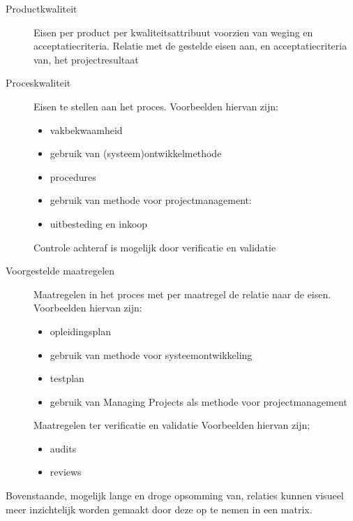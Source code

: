\begin{description}
  \item[Productkwaliteit] Eisen per product per kwaliteitsattribuut voorzien van weging en acceptatiecriteria.
  Relatie met de gestelde eisen aan, en acceptatiecriteria van, het projectresultaat
  \item[Proceskwaliteit] Eisen te stellen aan het proces. Voorbeelden hiervan zijn:
  \begin{itemize}
    \item vakbekwaamheid
    \item gebruik van (systeem)ontwikkelmethode
    \item procedures
    \item gebruik van methode voor projectmanagement:
    \item uitbesteding en inkoop
  \end{itemize}

  Controle achteraf is mogelijk door verificatie en validatie

  \item[Voorgestelde maatregelen] Maatregelen in het proces met per maatregel de relatie naar de eisen.
  Voorbeelden hiervan zijn:
  \begin{itemize}
    \item opleidingsplan
    \item gebruik van methode voor systeemontwikkeling
    \item testplan
    \item gebruik van Managing Projects als methode voor projectmanagement
  \end{itemize}

  Maatregelen ter verificatie en validatie
  Voorbeelden hiervan zijn;
  \begin{itemize}
    \item audits
    \item reviews
  \end{itemize}

\end{description}

Bovenstaande, mogelijk lange en droge opsomming van,
relaties kunnen visueel meer inzichtelijk worden gemaakt door deze op te nemen in een matrix.

